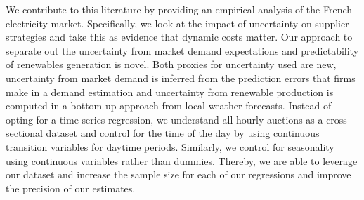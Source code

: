 We contribute to this literature by providing an empirical analysis of the French electricity market.
Specifically, we look at the impact of uncertainty on supplier strategies and take this as evidence that dynamic costs matter. 
 Our approach to separate out the uncertainty from market demand expectations and predictability of renewables generation is novel. Both proxies for uncertainty used are new, uncertainty from market demand is inferred from the prediction errors that firms make in a demand estimation and uncertainty from renewable production is computed in a bottom-up approach from local weather forecasts.
Instead of opting for a time series regression, we understand all hourly auctions as a cross-sectional dataset and control for the time of the day by using continuous transition variables for daytime periods. Similarly, we control for seasonality using continuous variables rather than dummies.  Thereby, %
we are able to leverage our dataset and increase the sample size for each of our regressions and improve the precision of our estimates. \\



%
%

